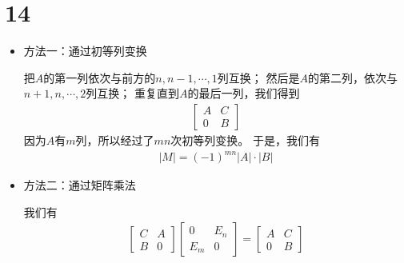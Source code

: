 \documentclass{article}
\begin{document}
\section*{14}

\begin{itemize}
  \item 方法一：通过初等列变换

        把$A$的第一列依次与前方的$n, n-1, \cdots, 1$列互换；
        然后是$A$的第二列，依次与$n+1, n, \cdots, 2$列互换；
        重复直到$A$的最后一列，我们得到
        \begin{align*}
          \begin{bmatrix}
            A & C \\
            0 & B
          \end{bmatrix}
        \end{align*}
        因为$A$有$m$列，所以经过了$m n$次初等列变换。
        于是，我们有
        \begin{align*}
          |M| = (-1)^{mn} |A| \cdot |B|
        \end{align*}

  \item 方法二：通过矩阵乘法

        我们有
        \begin{align*}
          \begin{bmatrix}
            C & A \\
            B & 0
          \end{bmatrix}
          \begin{bmatrix}
            0   & E_n \\
            E_m & 0
          \end{bmatrix}
          =
          \begin{bmatrix}
            A & C \\
            0 & B
          \end{bmatrix}
        \end{align*}


\end{itemize}
\end{document}
